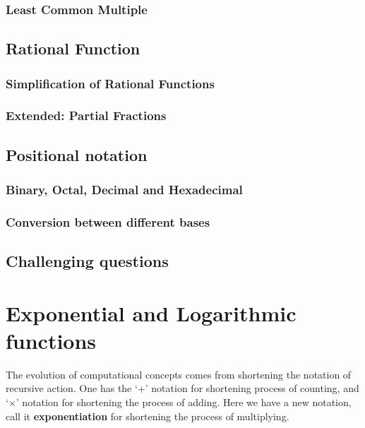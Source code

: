 \documentclass[12pt]{article}
\begin{document}
    \subsubsection*{Least Common Multiple}

    \subsection{Rational Function}

    \subsubsection*{Simplification of Rational Functions}

    \subsubsection*{Extended: Partial Fractions}

    \subsection{Positional notation}

    \subsubsection*{Binary, Octal, Decimal and Hexadecimal}

    \subsubsection*{Conversion between different bases}

    \subsection{Challenging questions}

    \newpage

    \section{Exponential and Logarithmic functions}

    The evolution of computational concepts comes from shortening the notation of recursive action. One has the `+' notation for shortening process of counting, and `$\times$' notation for shortening the process of adding. Here we have a new notation, call it \textbf{exponentiation} for shortening the process of multiplying.
\end{document}
